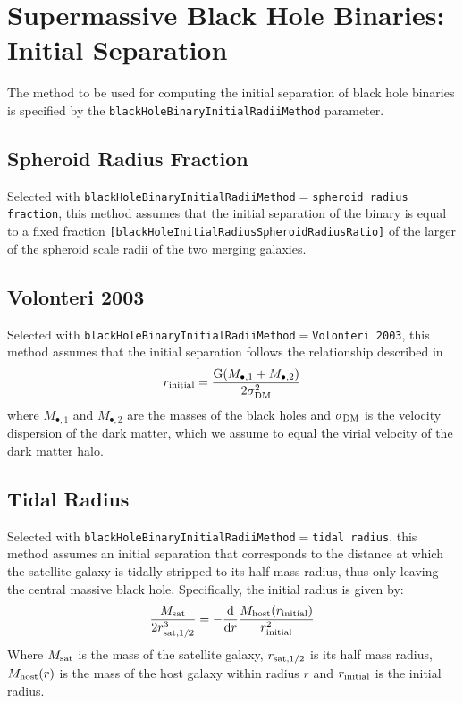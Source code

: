 \section{Supermassive Black Hole Binaries: Initial Separation}\label{sec:blackHoleBinaryInitialRadii}

The method to be used for computing the initial separation of black hole binaries is specified by the {\tt blackHoleBinaryInitialRadiiMethod} parameter.

\subsection{Spheroid Radius Fraction}

Selected with {\tt blackHoleBinaryInitialRadiiMethod}$=${\tt spheroid radius fraction}, this method assumes that the initial separation of the binary is equal to a fixed fraction {\tt [blackHoleInitialRadiusSpheroidRadiusRatio]} of the larger of the spheroid scale radii of the two merging galaxies.

\subsection{Volonteri 2003}

Selected with {\tt blackHoleBinaryInitialRadiiMethod}$=${\tt Volonteri 2003}, this method assumes that the initial separation follows the relationship described in \cite{volonteri_assembly_2003} 
\begin{equation}
 r_{\rm initial} = { {\rm G} (M_{\bullet,1} + M_{\bullet, 2}) \over 2
\sigma_{\rm DM}^2 }
\end{equation}
where $M_{\bullet, 1}$ and $M_{\bullet, 2}$ are the masses of the black holes
and $\sigma_{\rm DM}$ is the velocity dispersion of the dark matter, which we
assume to equal the virial velocity of the dark matter halo.

\subsection{Tidal Radius}

Selected with {\tt blackHoleBinaryInitialRadiiMethod}$=${\tt tidal radius}, this method assumes an initial separation that corresponds to the distance at which the satellite galaxy is tidally stripped to its half-mass radius, thus only leaving the central massive black hole.
Specifically, the initial radius is given by:
\begin{equation}
{M_{\rm sat} \over 2 r_{\rm sat,1/2}^3 } = - {{\rm d} \over {\rm d} r} {M_{\rm host}(r_{\rm initial}) \over r_{\rm initial}^2}
\end{equation}
Where $M_{\rm sat}$ is the mass of the satellite galaxy, $r_{\rm sat,1/2}$ is its half mass radius, $M_{\rm host}(r)$ is the mass of the host galaxy within radius $r$ and $r_{\rm initial}$ is the initial radius.

